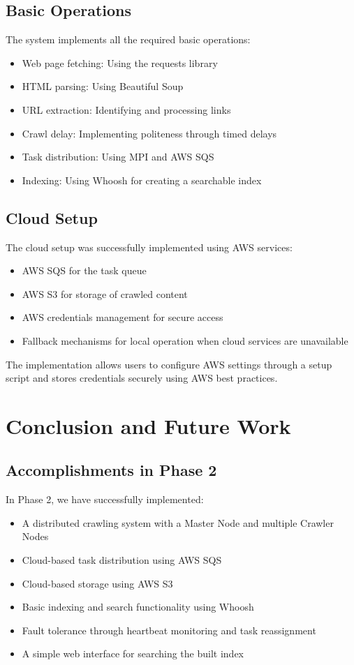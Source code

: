 \documentclass[12pt]{article}
\begin{document}
\subsection{Basic Operations}
The system implements all the required basic operations:
\begin{itemize}
    \item Web page fetching: Using the requests library
    \item HTML parsing: Using Beautiful Soup
    \item URL extraction: Identifying and processing links
    \item Crawl delay: Implementing politeness through timed delays
    \item Task distribution: Using MPI and AWS SQS
    \item Indexing: Using Whoosh for creating a searchable index
\end{itemize}

\subsection{Cloud Setup}
The cloud setup was successfully implemented using AWS services:
\begin{itemize}
    \item AWS SQS for the task queue
    \item AWS S3 for storage of crawled content
    \item AWS credentials management for secure access
    \item Fallback mechanisms for local operation when cloud services are unavailable
\end{itemize}

The implementation allows users to configure AWS settings through a setup script and stores credentials securely using AWS best practices.

\section{Conclusion and Future Work}

\subsection{Accomplishments in Phase 2}
In Phase 2, we have successfully implemented:
\begin{itemize}
    \item A distributed crawling system with a Master Node and multiple Crawler Nodes
    \item Cloud-based task distribution using AWS SQS
    \item Cloud-based storage using AWS S3
    \item Basic indexing and search functionality using Whoosh
    \item Fault tolerance through heartbeat monitoring and task reassignment
    \item A simple web interface for searching the built index
\end{itemize}
\end{document}
